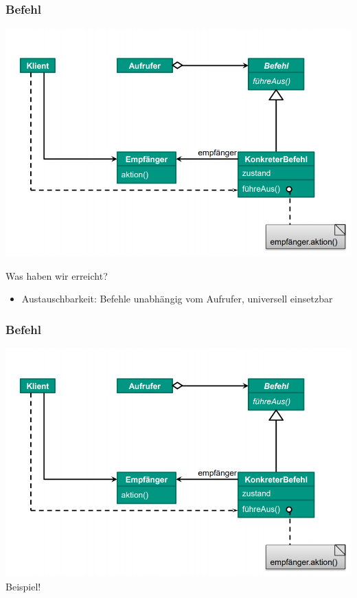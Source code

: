 \documentclass[18pt]{beamer}
\begin{document}
	\begin{frame}
		\frametitle{Befehl}
		\includegraphics[scale=0.35]{./pics/tut4/command.png}
		\begin{block}{Was haben wir erreicht?}
			\begin{itemize}
				 \pause
				\item Austauschbarkeit: Befehle unabhängig vom Aufrufer, universell einsetzbar
			\end{itemize}
		\end{block}
	\end{frame}
	
	\begin{frame}
		\frametitle{Befehl}
		\includegraphics[scale=0.4]{./pics/tut4/command.png}
		\linebreak
		\centering \large Beispiel!
	\end{frame}
	
\end{document}
